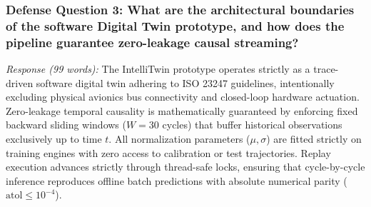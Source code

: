 \documentclass[12pt,a4paper]{article}
\begin{document}
\subsubsection*{Defense Question 3: What are the architectural boundaries of the software Digital Twin prototype, and how does the pipeline guarantee zero-leakage causal streaming?}
\textit{Response (99 words):} The IntelliTwin prototype operates strictly as a trace-driven software digital twin adhering to ISO 23247 guidelines, intentionally excluding physical avionics bus connectivity and closed-loop hardware actuation. Zero-leakage temporal causality is mathematically guaranteed by enforcing fixed backward sliding windows ($W=30$ cycles) that buffer historical observations exclusively up to time $t$. All normalization parameters ($\mu, \sigma$) are fitted strictly on training engines with zero access to calibration or test trajectories. Replay execution advances strictly through thread-safe locks, ensuring that cycle-by-cycle inference reproduces offline batch predictions with absolute numerical parity ($\text{atol} \le 10^{-4}$).
\end{document}
